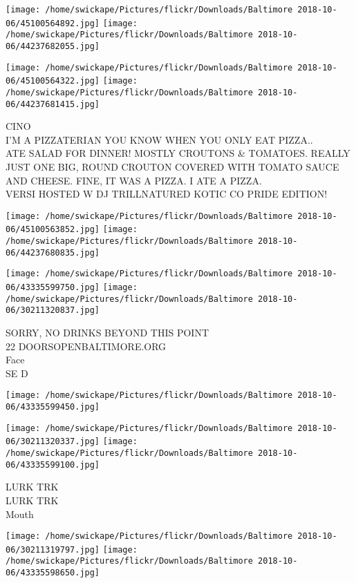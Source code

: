 \documentclass[10pt,letterpaper]{article}
\begin{document}
\texttt{[image: /home/swickape/Pictures/flickr/Downloads/Baltimore 2018-10-06/45100564892.jpg]}
\texttt{[image: /home/swickape/Pictures/flickr/Downloads/Baltimore 2018-10-06/44237682055.jpg]}

\texttt{[image: /home/swickape/Pictures/flickr/Downloads/Baltimore 2018-10-06/45100564322.jpg]}
\texttt{[image: /home/swickape/Pictures/flickr/Downloads/Baltimore 2018-10-06/44237681415.jpg]}

CINO\\
I'M A PIZZATERIAN YOU KNOW WHEN YOU ONLY EAT PIZZA..\\
ATE SALAD FOR DINNER!  MOSTLY CROUTONS \& TOMATOES.  REALLY JUST ONE BIG, ROUND CROUTON COVERED WITH TOMATO SAUCE AND CHEESE.  FINE, IT WAS A PIZZA.  I ATE A PIZZA.\\
VERSI HOSTED W DJ TRILLNATURED KOTIC CO PRIDE EDITION!\\
\pagebreak

\texttt{[image: /home/swickape/Pictures/flickr/Downloads/Baltimore 2018-10-06/45100563852.jpg]}
\texttt{[image: /home/swickape/Pictures/flickr/Downloads/Baltimore 2018-10-06/44237680835.jpg]}

\texttt{[image: /home/swickape/Pictures/flickr/Downloads/Baltimore 2018-10-06/43335599750.jpg]}
\texttt{[image: /home/swickape/Pictures/flickr/Downloads/Baltimore 2018-10-06/30211320837.jpg]}

SORRY, NO DRINKS BEYOND THIS POINT\\
22 DOORSOPENBALTIMORE.ORG\\
Face\\
SE D\\
\pagebreak

\texttt{[image: /home/swickape/Pictures/flickr/Downloads/Baltimore 2018-10-06/43335599450.jpg]}

\vspace{0.25in}
\texttt{[image: /home/swickape/Pictures/flickr/Downloads/Baltimore 2018-10-06/30211320337.jpg]}
\texttt{[image: /home/swickape/Pictures/flickr/Downloads/Baltimore 2018-10-06/43335599100.jpg]}

LURK TRK\\
LURK TRK\\
Mouth\\
\pagebreak

\texttt{[image: /home/swickape/Pictures/flickr/Downloads/Baltimore 2018-10-06/30211319797.jpg]}
\texttt{[image: /home/swickape/Pictures/flickr/Downloads/Baltimore 2018-10-06/43335598650.jpg]}
\end{document}
